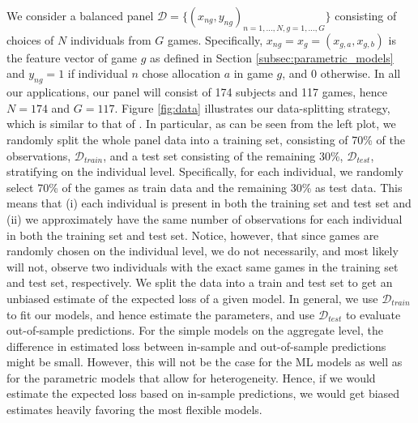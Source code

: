 \documentclass[11pt,a4paper]{article}
\theoremstyle{definition}
\begin{document}
We consider a balanced panel \(\mathcal{D}=\{(x_{ng},y_{ng})_{n=1,\dots,N,g=1,\dots,G}\}\) consisting of choices of \(N\) individuals from \(G\) games.  Specifically, \(x_{ng}=x_g = (x_{g,a},x_{g,b})\) is the feature vector of game \(g\) as defined in Section \ref{subsec:parametric_models} and \(y_{ng}=1\) if individual \(n\) chose allocation \(a\) in game \(g\), and 0 otherwise. In all our applications, our panel will consist of 174 subjects and 117 games, hence \(N=174\) and \(G=117\).  Figure \ref{fig:data} illustrates our data-splitting strategy, which is similar to that of \cite{Peysakhovich2017}. In particular,  as can be seen from the left plot, we randomly split the whole panel data into a training set, consisting of 70\% of the observations,  \(\mathcal{D}_{train}\), and a test set consisting of the remaining 30\%, \(\mathcal{D}_{test}\), stratifying on the individual level. Specifically, for each individual, we randomly select 70\% of the games as train data and the remaining 30\% as test data. This means that (i) each individual is present in both the training set and test set and (ii) we approximately have the same number of observations for each individual in both the training set and test set. Notice, however, that since games are randomly chosen on the individual level, we do not necessarily, and most likely will not, observe two individuals with the exact same games in the training set and test set, respectively. We split the data into a train and test set to get an unbiased estimate of the expected loss of a given model.  In general, we use \(\mathcal{D}_{train}\) to fit our models, and hence estimate the parameters, and use \(\mathcal{D}_{test}\) to evaluate out-of-sample predictions. For the simple models on the aggregate level, the difference in estimated loss between in-sample and out-of-sample predictions might be small. However, this will not be the case for the ML models as well as for the parametric models that allow for heterogeneity.  Hence, if we would estimate the expected loss based on in-sample predictions, we would get biased estimates heavily favoring the most flexible models.
\end{document}
